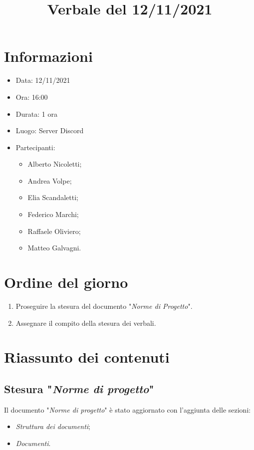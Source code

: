 \documentclass[a4paper,12pt]{article}
\author{}
\date{}
\begin{document}

\title{Verbale del 12/11/2021}
\maketitle

\section{Informazioni}

\begin{itemize}
\item Data: 12/11/2021
\item Ora: 16:00
\item Durata: 1 ora
\item Luogo: Server Discord
\item Partecipanti: 
\begin{itemize}
\item Alberto Nicoletti;
\item Andrea Volpe;
\item Elia Scandaletti;
\item Federico Marchi;
\item Raffaele Oliviero;
\item Matteo Galvagni.
\end{itemize}
\end{itemize}

\section{Ordine del giorno}
\begin{enumerate}
    \item Proseguire la stesura del documento "\textit{Norme di Progetto}".
    \item Assegnare il compito della stesura dei verbali.
\end{enumerate}

\section{Riassunto dei contenuti}


\subsection{Stesura "\textit{Norme di progetto}"} 
Il documento "\textit{Norme di progetto}" è stato aggiornato con l'aggiunta delle sezioni:
\begin{itemize}
    \item \textit{Struttura dei documenti};
    \item \textit{Documenti}.
\end{itemize}
\end{document}
